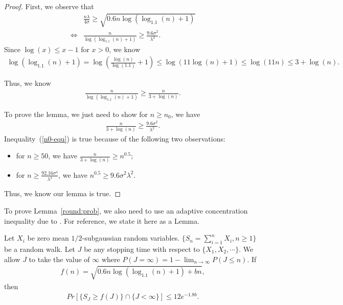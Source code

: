     \begin{proof}
    First, we observe that
    \begin{align}
    &\frac{n\lambda}{4\sigma}\geq \sqrt{0.6n\log(\log_{1.1}(n)+1)} \nonumber \\
      \iff &\frac{n}{\log(\log_{1.1}(n)+1)}\geq \frac{9.6\sigma^2}{\lambda^2}. \nonumber 
      \end{align}
      Since $\log(x)\leq x-1$ for $x>0$, we know 
      \begin{align}
      \log(\log_{1.1}(n)+1)=\log\left(\frac{\log(n)}{\log(1.1)}+1\right)\leq \log(11\log(n)+1)\leq \log(11n)\leq 3+\log(n). \nonumber
      \end{align}

      Thus, we know
      \begin{align}
      \frac{n}{\log(\log_{1.1}(n)+1)}\geq \frac{n}{3+\log(n)}. \nonumber 
      \end{align}

      To prove the lemma, we just need to show for $n\geq n_{0}$, we have
      \begin{align}
      \frac{n}{3+\log(n)}\geq \frac{9.6\sigma^2}{\lambda^2}. \label{n0-equ}
      \end{align}
      Inequality~(\ref{n0-equ}) is true because of the following two observations:
      \begin{itemize}
      \item for $n\geq 50$, we have $\frac{n}{3+\log(n)}\geq n^{0.5}$;
      \item for $n\geq \frac{92.16\sigma^4}{\lambda^4}$, we have $n^{0.5}\geq {9.6\sigma^{2}}{\lambda^{2}}$.
      \end{itemize}

      Thus, we know our lemma is true.

      \end{proof}

      To prove Lemma~\ref{round:prob}, we also need to use an adaptive concentration inequality due to \cite{zhao2016adaptive}. For reference, we state it here as a Lemma.

      \begin{lemma}
      Let $X_{i}$ be zero mean $1/2$-subgaussian random variables. $\{S_{n}=\sum_{i=1}^{n}X_{i},n\geq 1\}$ be a random walk. Let $J$ be any stopping time with respect to $\{X_1,X_2,\cdots\}$. We allow $J$ to take the value of $\infty$ where $P(J=\infty)=1-\lim_{n\rightarrow \infty}P(J\leq n)$. If
      \begin{align}
      f(n)=\sqrt{0.6n\log(\log_{1.1}(n)+1)+bn}, \nonumber
      \end{align}
      then
      \begin{align}
      Pr[\{S_{J}\geq f(J)\}\cap \{J<\infty\}]\leq 12e^{-1.8b}. \nonumber
      \end{align}
      \label{ACI-inequality}
      \end{lemma}


